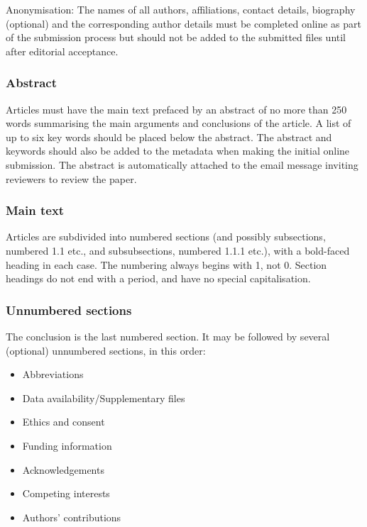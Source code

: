 \documentclass[cm,linguex]{glossa}
\begin{document}
Anonymisation: The names of all authors, affiliations, contact details,
biography (optional) and the corresponding author details must be
completed online as part of the submission process but should not be
added to the submitted files until after editorial acceptance.

\hypertarget{abstract}{%
\subsubsection{Abstract}\label{abstract}}

Articles must have the main text prefaced by an abstract of no more than
250 words summarising the main arguments and conclusions of the article.
A list of up to six key words should be placed below the abstract. The
abstract and keywords should also be added to the metadata when making
the initial online submission. The abstract is automatically attached to
the email message inviting reviewers to review the paper.

\hypertarget{main-text}{%
\subsubsection{Main text}\label{main-text}}

Articles are subdivided into numbered sections (and possibly
subsections, numbered 1.1 etc., and subsubsections, numbered 1.1.1
etc.), with a bold-faced heading in each case. The numbering always
begins with 1, not 0. Section headings do not end with a period, and
have no special capitalisation.

\hypertarget{unnumbered-sections}{%
\subsubsection{Unnumbered sections}\label{unnumbered-sections}}

The conclusion is the last numbered section. It may be followed by
several (optional) unnumbered sections, in this order:

\begin{itemize}
\item
  Abbreviations
\item
  Data availability/Supplementary files
\item
  Ethics and consent
\item
  Funding information
\item
  Acknowledgements
\item
  Competing interests
\item
  Authors' contributions
\end{itemize}
\end{document}
